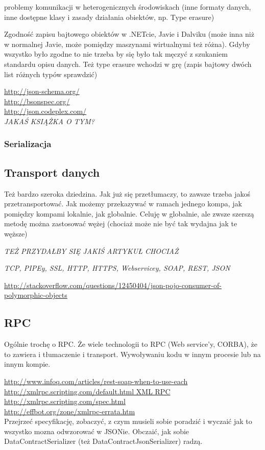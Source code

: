\documentclass[twoside,a4paper]{book}
\begin{document}
problemy komunikacji w heterogenicznych środowiskach (inne formaty danych, inne dostępne klasy i zasady działania obiektów, np. Type erasure)

Zgodność zapisu bajtowego obiektów w .NETcie, Javie i Dalviku (może inna niż w normalnej Javie, może pomiędzy maszynami wirtualnymi też różna). Gdyby wszystko było zgodne to nie trzeba by się było tak męczyć z szukaniem standardu opisu danych. Też type erasure wchodzi w grę (zapis bajtowy dwóch list różnych typów sprawdzić)

\url{http://json-schema.org/}\\
\url{http://bsonspec.org/}\\
\url{http://json.codeplex.com/}\\

\emph{JAKAŚ KSIĄŻKA O TYM?}

\subsubsection{Serializacja}

\subsection{Transport danych}
Też bardzo szeroka dziedzina. Jak już się przetłumaczy, to zawsze trzeba jakoś przetransportować. Jak możemy przekazywać w ramach jednego kompa, jak pomiędzy kompami lokalnie, jak globalnie.
Celuję w globalnie, ale zwsze szerszą metodę można zastosować wężej (chociaż może nie być tak wydajna jak te węższe)

\emph{TEŻ PRZYDAŁBY SIĘ JAKIŚ ARTYKUŁ CHOCIAŻ}

\emph{TCP, PIPEy, SSL, HTTP, HTTPS, Webservicey, SOAP, REST, JSON}

\url{http://stackoverflow.com/questions/12450404/json-pojo-consumer-of-polymorphic-objects}

\subsection{RPC}
Ogólnie trochę o RPC. Że wiele technologii to RPC (Web service'y, CORBA), że to zawiera i tłumaczenie i transport.
Wywoływaniu kodu w innym procesie lub na innym kompie.

\url{http://www.infoq.com/articles/rest-soap-when-to-use-each}\\

\url{http://xmlrpc.scripting.com/default.html XML RPC}\\
\url{http://xmlrpc.scripting.com/spec.html}\\
\url{http://effbot.org/zone/xmlrpc-errata.htm}\\
Przejrzeć specyfikację, zobaczyć, z czym musieli sobie poradzić i wyczaić jak to wszystko mozna odwzorować w JSONie. Obczaić, jak sobie DataContractSerializer (też DataContractJsonSerializer) radzą. 
\end{document}
